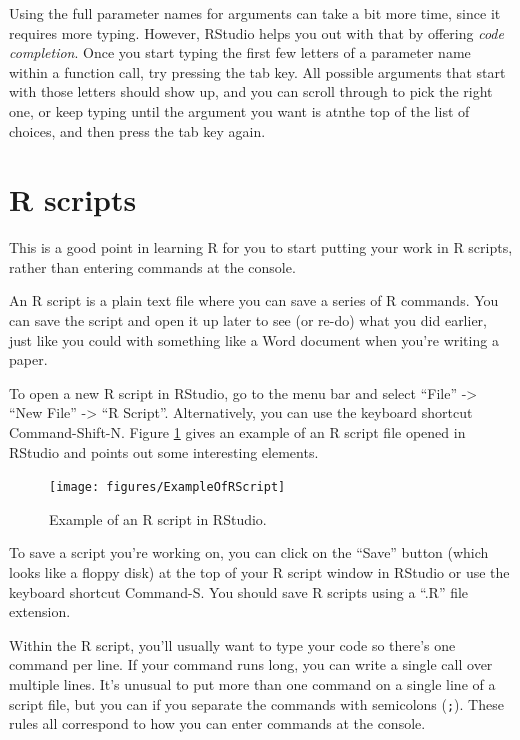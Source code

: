 \documentclass[]{book}
\makeatletter
\newenvironment{kframe}{%
\medskip{}
\setlength{\fboxsep}{.8em}
 \def\at@end@of@kframe{}%
 \ifinner\ifhmode%
  \def\at@end@of@kframe{\end{minipage}}%
  \begin{minipage}{\columnwidth}%
 \fi\fi%
 \def\FrameCommand##1{\hskip\@totalleftmargin \hskip-\fboxsep
 \colorbox{shadecolor}{##1}\hskip-\fboxsep
     \hskip-\linewidth \hskip-\@totalleftmargin \hskip\columnwidth}%
 \MakeFramed {\advance\hsize-\width
   \@totalleftmargin\z@ \linewidth\hsize
   \@setminipage}}%
 {\par\unskip\endMakeFramed%
 \at@end@of@kframe}
\newenvironment{rmdblock}[1]
  {
  \begin{itemize}
  \renewcommand{\labelitemi}{
    \raisebox{-.7\height}[0pt][0pt]{
      {\setkeys{Gin}{width=3em,keepaspectratio}\texttt{[image: images/\#1]}}
    }
  }
  \setlength{\fboxsep}{1em}
  \begin{kframe}
  \item
  }
  {
  \end{kframe}
  \end{itemize}
  }
\newenvironment{rmdtip}
  {\begin{rmdblock}{tip}}
  {\end{rmdblock}}
\theoremstyle{definition}
\theoremstyle{definition}
\theoremstyle{definition}
\theoremstyle{remark}
\makeatother
\begin{document}
\begin{rmdtip}
Using the full parameter names for arguments can take a bit more time,
since it requires more typing. However, RStudio helps you out with that
by offering \emph{code completion}. Once you start typing the first few
letters of a parameter name within a function call, try pressing the tab
key. All possible arguments that start with those letters should show
up, and you can scroll through to pick the right one, or keep typing
until the argument you want is atnthe top of the list of choices, and
then press the tab key again.
\end{rmdtip}

\section{R scripts}\label{r-scripts}

This is a good point in learning R for you to start putting your work in
R scripts, rather than entering commands at the console.

An R script is a plain text file where you can save a series of R
commands. You can save the script and open it up later to see (or re-do)
what you did earlier, just like you could with something like a Word
document when you're writing a paper.

To open a new R script in RStudio, go to the menu bar and select
``File'' -\textgreater{} ``New File'' -\textgreater{} ``R Script''.
Alternatively, you can use the keyboard shortcut Command-Shift-N. Figure
\ref{fig:rscript} gives an example of an R script file opened in RStudio
and points out some interesting elements.

\begin{figure}

{\centering \texttt{[image: figures/ExampleOfRScript]} 

}

\caption{Example of an R script in RStudio.}\label{fig:rscript}
\end{figure}

To save a script you're working on, you can click on the ``Save'' button
(which looks like a floppy disk) at the top of your R script window in
RStudio or use the keyboard shortcut Command-S. You should save R
scripts using a ``.R'' file extension.

Within the R script, you'll usually want to type your code so there's
one command per line. If your command runs long, you can write a single
call over multiple lines. It's unusual to put more than one command on a
single line of a script file, but you can if you separate the commands
with semicolons (\texttt{;}). These rules all correspond to how you can
enter commands at the console.
\end{document}
